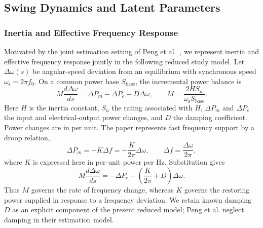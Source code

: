 \documentclass[journal]{IEEEtran}
\begin{document}
\subsection{Swing Dynamics and Latent Parameters}
\label{sec:dynamics}
\subsubsection{Inertia and Effective Frequency Response}
Motivated by the joint estimation setting of Peng et al.~\cite{peng2024probing},
we represent inertia and effective frequency response jointly in the following
reduced study model. Let $\Delta\omega(s)$ be angular-speed deviation
from an equilibrium with synchronous speed $\omega_{\mathrm s}=2\pi f_0$.
On a common power base $S_{\mathrm{base}}$, the incremental power balance is
\begin{equation}
M\frac{d\Delta\omega}{ds}
=\Delta P_m-\Delta P_e-D\Delta\omega,
\qquad M=\frac{2HS_n}{\omega_{\mathrm s}S_{\mathrm{base}}}.
\label{eq:inertia-balance}
\end{equation}
Here $H$ is the inertia constant, $S_n$ the rating associated with $H$,
$\Delta P_m$ and $\Delta P_e$ the input and electrical-output power changes,
and $D$ the damping coefficient. Power changes are in per unit.
The paper represents fast frequency support by a droop relation,
\begin{equation}
\Delta P_m=-K\Delta f=-\frac{K}{2\pi}\Delta\omega,
\qquad \Delta f=\frac{\Delta\omega}{2\pi},
\label{eq:frequency-support}
\end{equation}
where $K$ is expressed here in per-unit power per Hz. Substitution gives
\begin{equation}
M\frac{d\Delta\omega}{ds}
=-\Delta P_e-\left(\frac{K}{2\pi}+D\right)\Delta\omega.
\label{eq:aggregate_model}
\end{equation}
Thus $M$ governs the rate of frequency change, whereas $K$ governs the
restoring power supplied in response to a frequency deviation. We retain
known damping $D$ as an explicit component of the present reduced model;
Peng et al. neglect damping in their estimation model.
\end{document}
